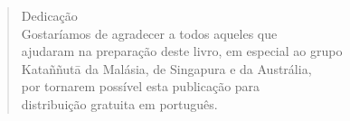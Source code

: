 \cleartorecto
\thispagestyle{empty}


\mbox{}\vfill

\begin{verse}

{\upshape Dedicação}\\[0.4\baselineskip]
Gostaríamos de agradecer a todos aqueles que\\
ajudaram na preparação deste livro, em especial ao grupo\\
Kataññutā da Malásia, de Singapura e da Austrália,\\
por tornarem possível esta publicação para\\
distribuição gratuita em português.
\end{verse}

\vfill\mbox{}
